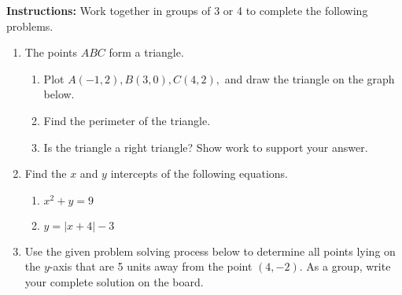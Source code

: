 


\noindent \textbf{Instructions:}  Work together in groups of  3 or 4 to complete the following problems.


\begin{enumerate}
\item The points $ABC$ form a triangle.
\begin{enumerate}
\item Plot $A(-1,2),B(3,0) , C(4,2), $ and draw the triangle on the graph below.\\


\item Find the perimeter of the triangle.\vfill
\item Is the triangle a right triangle?  Show work to support your answer.\\[1in]
\end{enumerate}


\newpage


\item Find the $x$ and $y$ intercepts of the following equations.
\begin{enumerate}
\item $x^2+y=9$
\vfill
\item $y=|x+4|-3$
\end{enumerate}
\vfill

\newpage

\item Use the given problem solving process below to determine all points lying on the $y$-axis that are 5 units away from the point $(4,-2)$.  As a group, write your complete solution on the board. 



\end{enumerate}
